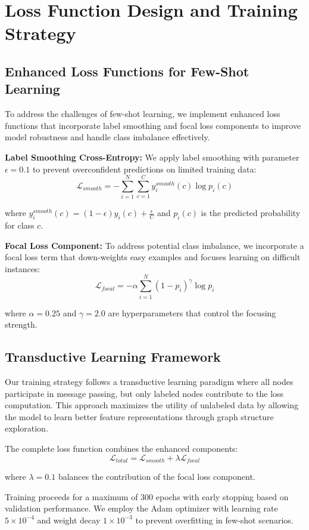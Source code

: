 \section{Loss Function Design and Training Strategy}

\subsection{Enhanced Loss Functions for Few-Shot Learning}

To address the challenges of few-shot learning, we implement enhanced loss functions that incorporate label smoothing and focal loss components to improve model robustness and handle class imbalance effectively.

\textbf{Label Smoothing Cross-Entropy:} We apply label smoothing with parameter $\epsilon = 0.1$ to prevent overconfident predictions on limited training data:
\begin{equation}
\mathcal{L}_{smooth} = -\sum_{i=1}^{N} \sum_{c=1}^{C} y_i^{smooth}(c) \log p_i(c)
\end{equation}

where $y_i^{smooth}(c) = (1-\epsilon)y_i(c) + \frac{\epsilon}{C}$ and $p_i(c)$ is the predicted probability for class $c$.

\textbf{Focal Loss Component:} To address potential class imbalance, we incorporate a focal loss term that down-weights easy examples and focuses learning on difficult instances:
\begin{equation}
\mathcal{L}_{focal} = -\alpha \sum_{i=1}^{N} (1-p_i)^{\gamma} \log p_i
\end{equation}

where $\alpha = 0.25$ and $\gamma = 2.0$ are hyperparameters that control the focusing strength.

\subsection{Transductive Learning Framework}

Our training strategy follows a transductive learning paradigm where all nodes participate in message passing, but only labeled nodes contribute to the loss computation. This approach maximizes the utility of unlabeled data by allowing the model to learn better feature representations through graph structure exploration.

The complete loss function combines the enhanced components:
\begin{equation}
\mathcal{L}_{total} = \mathcal{L}_{smooth} + \lambda \mathcal{L}_{focal}
\end{equation}

where $\lambda = 0.1$ balances the contribution of the focal loss component.

Training proceeds for a maximum of 300 epochs with early stopping based on validation performance. We employ the Adam optimizer with learning rate $5 \times 10^{-4}$ and weight decay $1 \times 10^{-3}$ to prevent overfitting in few-shot scenarios.

\EndChapter
